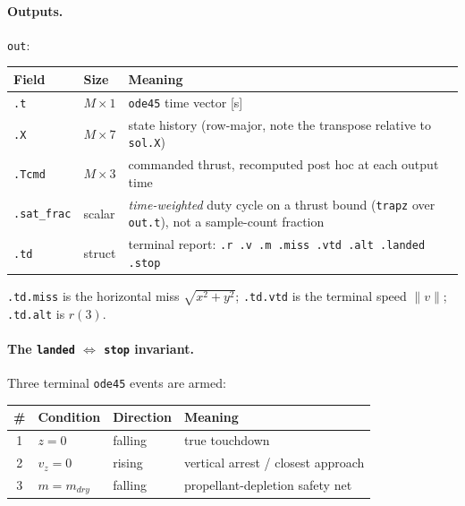 \documentclass[11pt]{article}
\begin{document}
\paragraph{Outputs.} \texttt{out}:

\begin{center}
\begin{tabular}{@{}llL{7.4cm}@{}}
\toprule
Field & Size & Meaning \\
\midrule
\texttt{.t} & $M\times1$ & \texttt{ode45} time vector [s] \\
\texttt{.X} & $M\times7$ & state history (row-major, note the transpose
  relative to \texttt{sol.X}) \\
\texttt{.Tcmd} & $M\times3$ & commanded thrust, recomputed post hoc at each
  output time \\
\texttt{.sat\_frac} & scalar & \emph{time-weighted} duty cycle on a thrust
  bound (\texttt{trapz} over \texttt{out.t}), not a sample-count fraction \\
\texttt{.td} & struct & terminal report: \texttt{.r .v .m .miss .vtd .alt
  .landed .stop} \\
\bottomrule
\end{tabular}
\end{center}

\texttt{.td.miss} is the horizontal miss $\sqrt{x^2+y^2}$; \texttt{.td.vtd}
is the terminal speed $\lVert v\rVert$; \texttt{.td.alt} is $r(3)$.

\paragraph{The \texttt{landed} $\Leftrightarrow$ \texttt{stop} invariant.}
Three terminal \texttt{ode45} events are armed:

\begin{center}
\begin{tabular}{@{}clll@{}}
\toprule
\# & Condition & Direction & Meaning \\
\midrule
1 & $z = 0$ & falling & true touchdown \\
2 & $v_z = 0$ & rising & vertical arrest / closest approach \\
3 & $m = m_{dry}$ & falling & propellant-depletion safety net \\
\bottomrule
\end{tabular}
\end{center}
\end{document}
